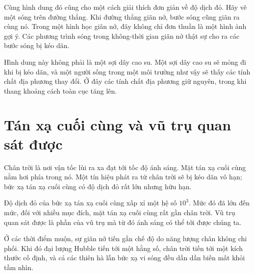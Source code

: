 Cùng hình dung đó cũng cho một cách giải thích đơn giản về độ dịch đỏ. Hãy vẽ một sóng trên đường thẳng. Khi đường thẳng giãn nở, bước sóng cũng giãn ra cùng nó. Trong một hình học giãn nở, đây không chỉ đơn thuần là một hình ảnh gợi ý. Các phương trình sóng trong không-thời gian giãn nở thật sự cho ra các bước sóng bị kéo dãn.

\begin{classroomqa}
\end{classroomqa}

Hình dung này không phải là một sợi dây cao su. Một sợi dây cao su sẽ mỏng đi khi bị kéo dãn, và một người sống trong một môi trường như vậy sẽ thấy các tính chất địa phương thay đổi. Ở đây các tính chất địa phương giữ nguyên, trong khi thang khoảng cách toàn cục tăng lên.

\section{Tán xạ cuối cùng và vũ trụ quan sát được}

Chân trời là nơi vận tốc lùi ra xa đạt tới tốc độ ánh sáng. Mặt tán xạ cuối cùng nằm hơi phía trong nó. Một tín hiệu phát ra từ chân trời sẽ bị kéo dãn vô hạn; bức xạ tán xạ cuối cùng có độ dịch đỏ rất lớn nhưng hữu hạn.

\begin{classroomqa}
\end{classroomqa}

Độ dịch đỏ của bức xạ tán xạ cuối cùng xấp xỉ một hệ số \(10^3\). Mức đó đã lớn đến mức, đối với nhiều mục đích, mặt tán xạ cuối cùng rất gần chân trời. Vũ trụ quan sát được là phần của vũ trụ mà từ đó ánh sáng có thể tới được chúng ta.

Ở các thời điểm muộn, sự giãn nở tiến gần chế độ do năng lượng chân không chi phối. Khi đó đại lượng Hubble tiến tới một hằng số, chân trời tiến tới một kích thước cố định, và cả các thiên hà lẫn bức xạ vi sóng đều dần dần biến mất khỏi tầm nhìn.

